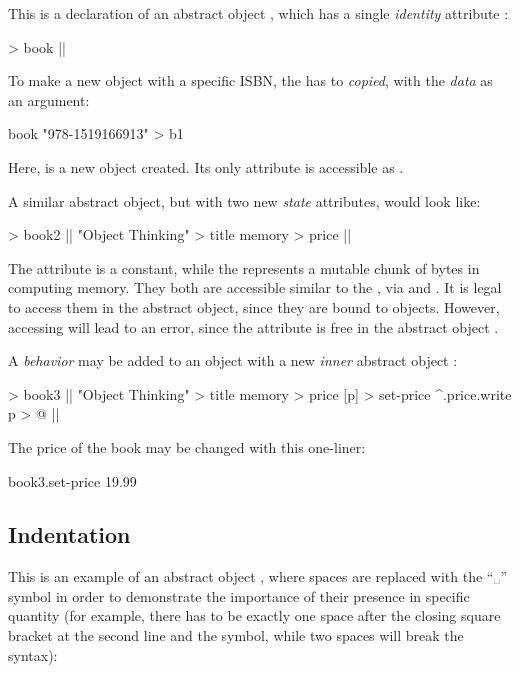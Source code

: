 This is a declaration of an abstract object ,
which has a single \emph{identity} attribute :

\begin{ffcode}
[isbn] > book |$\label{ln:book}$|
\end{ffcode}

To make a new object with a specific ISBN, the 
has to \emph{copied}, with the \emph{data} as an argument:

\begin{ffcode}
book "978-1519166913" > b1
\end{ffcode}

Here,  is a new object created.
Its only attribute is accessible as .

A similar abstract object, but with two new \emph{state} attributes, would
look like:

\begin{ffcode}
[isbn] > book2  |$\label{ln:book2}$|
  "Object Thinking" > title
  memory > price |$\label{ln:book2-end}$|
\end{ffcode}

The attribute  is a constant, while the 
represents a mutable chunk of bytes in computing memory. They both are
accessible similar to the , via 
and . It is legal to access them in the abstract
object, since they are bound to objects. However, accessing 
will lead to an error, since the attribute  is free
in the abstract object .

A \emph{behavior} may be added to an object with a new \emph{inner}
abstract object :

\begin{ffcode}
[isbn] > book3 |$\label{ln:book3}$|
  "Object Thinking" > title
  memory > price
  [p] > set-price
    ^.price.write p > @ |$\label{ln:book3-end}$|
\end{ffcode}

The price of the book may be changed with this one-liner:

\begin{ffcode}
book3.set-price 19.99
\end{ffcode}

\subsection{Indentation}

This is an example of an abstract object , where
spaces are replaced with the ``␣'' symbol in order to demonstrate
the importance of their presence in specific quantity
(for example, there has to be exactly one space after the closing square bracket at the
second line and the \ff{>} symbol, while two spaces will break the syntax):

